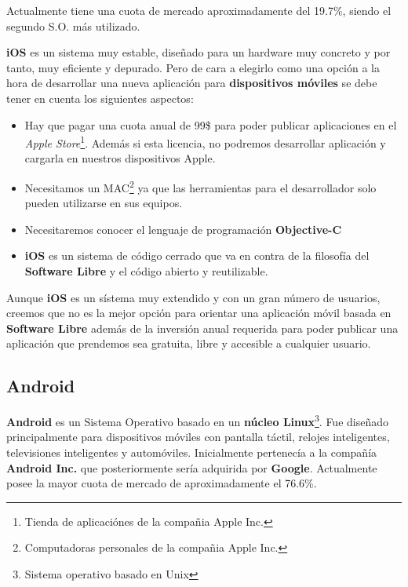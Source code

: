 \bigskip
Actualmente tiene una cuota de mercado aproximadamente del 19.7\%, siendo el segundo S.O. más utilizado.

\bigskip
\textbf{iOS} es un sistema muy estable, diseñado para un hardware muy concreto y por tanto, muy eficiente y depurado. Pero de cara a elegirlo como una opción a la hora de desarrollar una nueva aplicación para \textbf{dispositivos móviles} se debe tener en cuenta los siguientes aspectos:

\begin{itemize}
  \item Hay que pagar una cuota anual de 99\$ para poder publicar aplicaciones en el \textit{Apple Store}\footnote{Tienda de aplicaciónes de la compañia Apple Inc.}. Además si esta licencia, no podremos desarrollar aplicación y cargarla en nuestros dispositivos Apple.
  \item Necesitamos un MAC\footnote{Computadoras personales de la compañia Apple Inc.} ya que las herramientas para el desarrollador solo pueden utilizarse en sus equipos.
  \item Necesitaremos conocer el lenguaje de programación \textbf{Objective-C}
  \item \textbf{iOS} es un sistema de código cerrado que va en contra de la filosofía del \textbf{Software Libre} y el código abierto y reutilizable.

\end{itemize}

\bigskip
Aunque \textbf{iOS} es un sístema muy extendido y con un gran número de usuarios, creemos que no es la mejor opción para orientar una aplicación móvil basada en \textbf{Software Libre} además de la inversión anual requerida para poder publicar una aplicación que prendemos sea gratuita, libre y accesible a cualquier usuario.


\subsection{Android}

\textbf{Android} es un Sistema Operativo basado en un \textbf{núcleo Linux}\footnote{Sistema operativo basado en Unix}. Fue diseñado principalmente para dispositivos móviles con pantalla táctil, relojes inteligentes, televisiones inteligentes y automóviles. Inicialmente pertenecía a la compañía \textbf{Android Inc.} que posteriormente sería adquirida por \textbf{Google}. Actualmente posee la mayor cuota de mercado de aproximadamente el 76.6\%.

